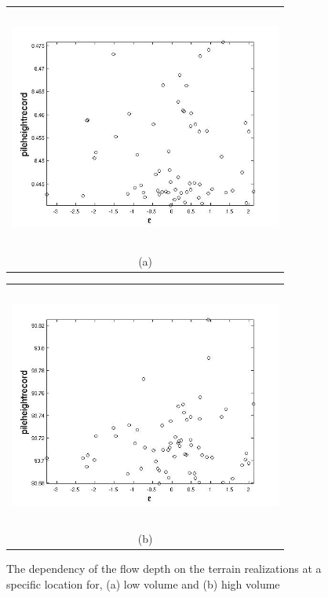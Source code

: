 \documentclass[a4paper,fleqn]{article}
\begin{document}
\begin{figure}[H]
    \begin{minipage}[b]{0.6\textwidth}
        \begin{tabular}{c}
        \includegraphics[width=9cm,height=8cm,keepaspectratio]{eps_vs_pile_low_vol_res.jpg}\\
        (a)
        \end{tabular}
    \end{minipage}
    \begin{minipage}{0.6\textwidth}
        \begin{tabular}{c}
        \includegraphics[width=9cm,height=8cm,keepaspectratio]{eps_vs_pile_high_vol_res.jpg}\\
        (b)
        \end{tabular}
    \end{minipage} 
\caption{The dependency of the flow depth on the terrain realizations at a specific location for, (a) low volume and (b) high volume}
\label{fig4}  
\end{figure}
\end{document}
